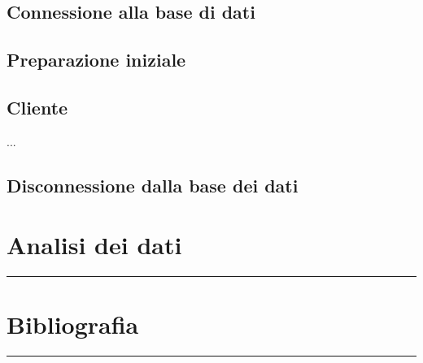 \documentclass[legalpaper]{article}
\begin{document}
\subsection{Connessione alla base di dati}
\subsection{Preparazione iniziale}
\subsection{Cliente}

...

\subsection{Disconnessione dalla base dei dati}
\newpage
\section{Analisi dei dati}
\rule{\linewidth}{1.5pt}

\newpage

\section{Bibliografia}
\rule{\linewidth}{1.5pt}
\end{document}
